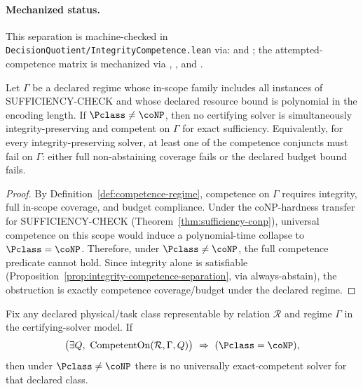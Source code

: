 \paragraph{Mechanized status.}
This separation is machine-checked in \texttt{DecisionQuotient/IntegrityCompetence.lean} via:
 and ; the attempted-competence matrix is mechanized via
, , and .

\begin{proposition}\label{prop:integrity-resource-bound}
Let $\Gamma$ be a declared regime whose in-scope family includes all instances of SUFFICIENCY-CHECK and whose declared resource bound is polynomial in the encoding length. If $\Pclass \neq \coNP$, then no certifying solver is simultaneously integrity-preserving and competent on $\Gamma$ for exact sufficiency.
Equivalently, for every integrity-preserving solver, at least one of the competence conjuncts must fail on $\Gamma$: either full non-abstaining coverage fails or the declared budget bound fails.
\end{proposition}

\begin{proof}
By Definition~\ref{def:competence-regime}, competence on $\Gamma$ requires integrity, full in-scope coverage, and budget compliance. Under the coNP-hardness transfer for SUFFICIENCY-CHECK (Theorem~\ref{thm:sufficiency-conp}), universal competence on this scope would induce a polynomial-time collapse to $\Pclass=\coNP$. Therefore, under $\Pclass \neq \coNP$, the full competence predicate cannot hold.
Since integrity alone is satisfiable (Proposition~\ref{prop:integrity-competence-separation}, via always-abstain), the obstruction is exactly competence coverage/budget under the declared regime.
\end{proof}

\begin{proposition}\label{prop:physics-no-universal-exact}
Fix any declared physical/task class representable by relation $\mathcal{R}$ and regime $\Gamma$ in the certifying-solver model. If
\[
\big(\exists Q,\ \mathrm{CompetentOn}(\mathcal{R},\Gamma,Q)\big)\ \Rightarrow\ (\Pclass=\coNP),
\]
then under $\Pclass\neq\coNP$ there is no universally exact-competent solver for that declared class.
\end{proposition}

